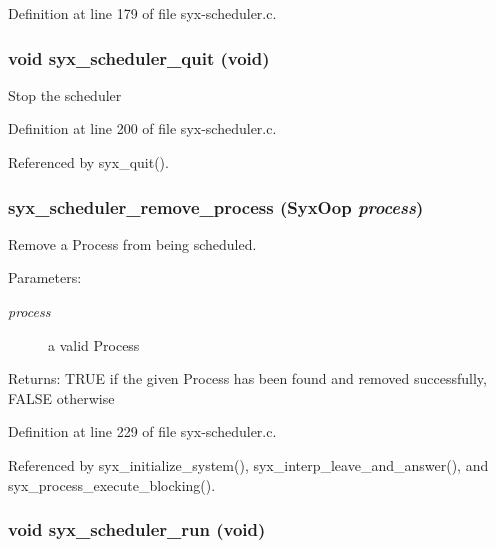 Definition at line 179 of file syx-scheduler.c.\hypertarget{syx-scheduler_8c_4a871e11c8c343aee6d766dab4b59383}{
\subsubsection{\setlength{\rightskip}{0pt plus 5cm}void syx\_\-scheduler\_\-quit (void)}}
\label{syx-scheduler_8c_4a871e11c8c343aee6d766dab4b59383}


Stop the scheduler 

Definition at line 200 of file syx-scheduler.c.

Referenced by syx\_\-quit().\hypertarget{syx-scheduler_8c_5eed9263555dd5245c7ab05cdf59d995}{
\subsubsection{ syx\_\-scheduler\_\-remove\_\-process ({\bf SyxOop} {\em process})}}
\label{syx-scheduler_8c_5eed9263555dd5245c7ab05cdf59d995}


Remove a Process from being scheduled. \begin{Desc}
\item[Parameters:]
\begin{description}
\item[{\em process}]a valid Process \end{description}
\end{Desc}
\begin{Desc}
\item[Returns:]TRUE if the given Process has been found and removed successfully, FALSE otherwise \end{Desc}


Definition at line 229 of file syx-scheduler.c.

Referenced by syx\_\-initialize\_\-system(), syx\_\-interp\_\-leave\_\-and\_\-answer(), and syx\_\-process\_\-execute\_\-blocking().\hypertarget{syx-scheduler_8c_b2a6b8c50609209c4ce77e0ee93ad15c}{
\subsubsection{\setlength{\rightskip}{0pt plus 5cm}void syx\_\-scheduler\_\-run (void)}}
\label{syx-scheduler_8c_b2a6b8c50609209c4ce77e0ee93ad15c}


